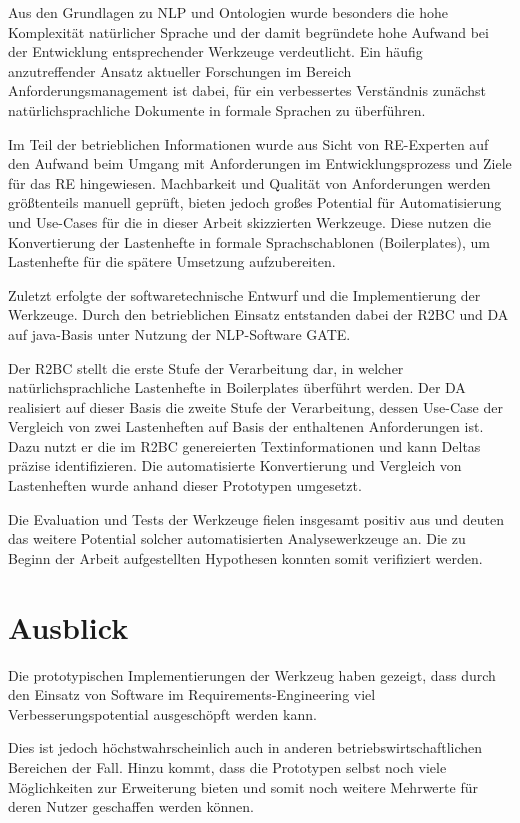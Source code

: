 \documentclass[12pt]{report}
\begin{document}
\vspace{12pt}
Aus den Grundlagen zu NLP und Ontologien wurde besonders die hohe Komplexität natürlicher Sprache und der damit begründete hohe Aufwand bei der Entwicklung entsprechender Werkzeuge verdeutlicht. Ein häufig anzutreffender Ansatz aktueller Forschungen im Bereich Anforderungsmanagement ist dabei, für ein verbessertes Verständnis zunächst natürlichsprachliche Dokumente in formale Sprachen zu überführen.

Im Teil der betrieblichen Informationen wurde aus Sicht von RE-Experten auf den Aufwand beim Umgang mit Anforderungen im Entwicklungsprozess und Ziele für das RE hingewiesen. Machbarkeit und Qualität von Anforderungen werden größtenteils manuell geprüft, bieten jedoch großes Potential für Automatisierung und Use-Cases für die in dieser Arbeit skizzierten Werkzeuge. Diese nutzen die Konvertierung der Lastenhefte in formale Sprachschablonen (Boilerplates), um Lastenhefte für die spätere Umsetzung aufzubereiten.

Zuletzt erfolgte der softwaretechnische Entwurf und die Implementierung der Werkzeuge. Durch den betrieblichen Einsatz entstanden dabei der R2BC und DA auf java-Basis unter Nutzung der NLP-Software GATE.

Der R2BC stellt die erste Stufe der Verarbeitung dar, in welcher natürlichsprachliche Lastenhefte in Boilerplates überführt werden. Der DA realisiert auf dieser Basis die zweite Stufe der Verarbeitung, dessen Use-Case der Vergleich von zwei Lastenheften auf Basis der enthaltenen Anforderungen ist. Dazu nutzt er die im R2BC genereierten Textinformationen und kann Deltas präzise identifizieren. Die automatisierte Konvertierung und Vergleich von Lastenheften wurde anhand dieser Prototypen umgesetzt. 

\vspace{12pt}
Die Evaluation und Tests der Werkzeuge fielen insgesamt positiv aus und deuten das weitere Potential solcher automatisierten Analysewerkzeuge an. Die zu Beginn der Arbeit aufgestellten Hypothesen konnten somit verifiziert werden.
\section{Ausblick}
Die prototypischen Implementierungen der Werkzeug haben gezeigt, dass durch den Einsatz von Software im Requirements-Engineering viel Verbesserungspotential ausgeschöpft werden kann. 

Dies ist jedoch höchstwahrscheinlich auch in anderen betriebswirtschaftlichen Bereichen der Fall. Hinzu kommt, dass die Prototypen selbst noch viele Möglichkeiten zur Erweiterung bieten und somit noch weitere Mehrwerte für deren Nutzer geschaffen werden können. 
\end{document}
